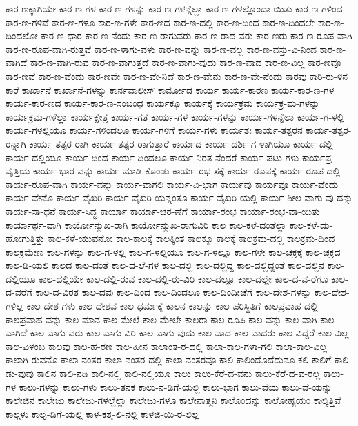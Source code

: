 ಕಾರ-ಣಕ್ಕಾಗಿಯೇ
ಕಾರ-ಣ-ಗಳ
ಕಾರ-ಣ-ಗಳನ್ನು
ಕಾರ-ಣ-ಗಳನ್ನೆಲ್ಲಾ
ಕಾರ-ಣ-ಗಳಲ್ಲೊಂದಾ-ಯಿತು
ಕಾರ-ಣ-ಗಳಿಂದ
ಕಾರ-ಣ-ಗಳಿವೆ
ಕಾರ-ಣ-ಗಳೂ
ಕಾರ-ಣ-ಗಳೇ
ಕಾರ-ಣದ
ಕಾರ-ಣ-ದಲ್ಲಿ
ಕಾರ-ಣ-ದಿಂದ
ಕಾರ-ಣ-ದಿಂದಲೇ
ಕಾರ-ಣ-ದಿಂದಲೋ
ಕಾರ-ಣ-ಧಾರ
ಕಾರ-ಣ-ನೆಂದು
ಕಾರ-ಣ-ರಾಗುವರು
ಕಾರ-ಣ-ರಾದ-ವರು
ಕಾರ-ಣರು
ಕಾರ-ಣ-ರೂಪ-ವಾಗಿ
ಕಾರ-ಣ-ರೂಪ-ವಾಗಿ-ರುತ್ತವೆ
ಕಾರ-ಣ-ಳಾಗು-ವಳು
ಕಾರ-ಣ-ವನ್ನು
ಕಾರ-ಣ-ವಲ್ಲ
ಕಾರ-ಣ-ವಸ್ತು-ವಿ-ನಿಂದ
ಕಾರ-ಣ-ವಾಗಿದೆ
ಕಾರ-ಣ-ವಾಗಿ-ರುವ
ಕಾರ-ಣ-ವಾಗುತ್ತದೆ
ಕಾರ-ಣ-ವಾಗು-ವುದು
ಕಾರ-ಣ-ವಾದ
ಕಾರ-ಣ-ವಿಲ್ಲ
ಕಾರ-ಣವೂ
ಕಾರ-ಣವೆ
ಕಾರ-ಣ-ವೆಂದು
ಕಾರ-ಣವೇ
ಕಾರ-ಣ-ವೇ-ನಿದೆ
ಕಾರ-ಣ-ವೇನು
ಕಾರ-ಣ-ವೇ-ನೆಂದು
ಕಾರವು
ಕಾರಿ-ರು-ಳಿನ
ಕಾರೆ
ಕಾರ್ಖಾನೆ
ಕಾರ್ಖಾನೆ-ಗಳನ್ನು
ಕಾರ್ನವಾಲೀಸ್
ಕಾರ್ಮೋಡ
ಕಾರ್ಯ
ಕಾರ್ಯ-ಕಾರಣ
ಕಾರ್ಯ-ಕಾರ-ಣ-ಗಳ
ಕಾರ್ಯ-ಕಾರ-ಣದ
ಕಾರ್ಯ-ಕಾರ-ಣ-ಸಂಬಂಧ
ಕಾರ್ಯಕ್ಕೂ
ಕಾರ್ಯಕ್ಕೆ
ಕಾರ್ಯಕ್ರಮ
ಕಾರ್ಯಕ್ರ-ಮ-ಗಳನ್ನು
ಕಾರ್ಯಕ್ರಮ-ಗಳೆಲ್ಲಾ
ಕಾರ್ಯಕ್ಷೇತ್ರ
ಕಾರ್ಯ-ಗತ
ಕಾರ್ಯ-ಗಳ
ಕಾರ್ಯ-ಗಳನ್ನು
ಕಾರ್ಯ-ಗಳನ್ನೆಲಾ
ಕಾರ್ಯ-ಗ-ಳಲ್ಲಿ
ಕಾರ್ಯ-ಗಳಲ್ಲಿಯೂ
ಕಾರ್ಯ-ಗಳಿಂದಲೂ
ಕಾರ್ಯ-ಗಳಿಗೆ
ಕಾರ್ಯ-ಗಳು
ಕಾರ್ಯತಃ
ಕಾರ್ಯ-ತತ್ಪರನ
ಕಾರ್ಯ-ತತ್ಪರ-ರನ್ನಾಗಿ
ಕಾರ್ಯ-ತತ್ಪರ-ರಾಗಿ
ಕಾರ್ಯ-ತತ್ಪರ-ರಾಗುತ್ತಾರೆ
ಕಾರ್ಯದ
ಕಾರ್ಯ-ದರ್ಶಿ-ಗ-ಳಾಗಿಯೂ
ಕಾರ್ಯ-ದಲ್ಲಿ
ಕಾರ್ಯ-ದಲ್ಲಿಯೂ
ಕಾರ್ಯ-ದಿಂದ
ಕಾರ್ಯ-ದಿಂದಲೂ
ಕಾರ್ಯ-ನಿರತ-ನೆಂದರೆ
ಕಾರ್ಯ-ಪಟು-ಗಳು
ಕಾರ್ಯಪ್ರ-ವೃತ್ತಿಯ
ಕಾರ್ಯ-ಭಾರ-ವನ್ನು
ಕಾರ್ಯ-ಮಾಡಿ-ಕೊಂಡು
ಕಾರ್ಯ-ರಭ-ಸಕ್ಕೆ
ಕಾರ್ಯ-ರೂಪಕ್ಕೆ
ಕಾರ್ಯ-ರೂಪ-ದಲ್ಲಿ
ಕಾರ್ಯ-ರೂಪ-ವಾಗಿ
ಕಾರ್ಯ-ವನ್ನು
ಕಾರ್ಯ-ವಾಗಲಿ
ಕಾರ್ಯ-ವಿ-ಭಾಗ
ಕಾರ್ಯವು
ಕಾರ್ಯವೂ
ಕಾರ್ಯ-ವೆಂದು
ಕಾರ್ಯ-ವೇನೊ
ಕಾರ್ಯ-ವೈಖರಿ
ಕಾರ್ಯ-ವೈಖರಿ-ಯನ್ನಂತೂ
ಕಾರ್ಯ-ವೈಖರಿ-ಯಲ್ಲಿ
ಕಾರ್ಯ-ಶೀಲ-ವಾಗು-ವು-ದನ್ನು
ಕಾರ್ಯ-ಸಾ-ಧನೆ
ಕಾರ್ಯ-ಸಿದ್ಧ
ಕಾರ್ಯಾ
ಕಾರ್ಯಾ-ಚರ-ಣೆಗೆ
ಕಾರ್ಯಾ-ರಂಭ
ಕಾರ್ಯಾ-ರಂಭ-ವಾ-ಯಿತು
ಕಾರ್ಯಾರ್ಥ-ವಾಗಿ
ಕಾರ್ಯೋನ್ಮುಖ-ರಾಗಿ
ಕಾರ್ಯೋನ್ಮುಖ-ರಾಗುವಿರಿ
ಕಾಲ
ಕಾಲ-ಕಳೆ-ದಂತೆಲ್ಲಾ
ಕಾಲ-ಕಳೆ-ದು-ಹೋಗುತ್ತಿತ್ತು
ಕಾಲ-ಕಳೆ-ಯುವನೋ
ಕಾಲ-ಕಾಲಕ್ಕೆ
ಕಾಲಕ್ಕಿಂತ
ಕಾಲಕ್ಕೂ
ಕಾಲಕ್ಕೆ
ಕಾಲಕ್ರಮ-ದಲ್ಲಿ
ಕಾಲಕ್ರಮ-ದಿಂದ
ಕಾಲಕ್ರಮೇಣ
ಕಾಲ-ಗಳನ್ನು
ಕಾಲ-ಗ-ಳಲ್ಲಿ
ಕಾಲ-ಗ-ಳಲ್ಲಿಯೂ
ಕಾಲ-ಗ-ಳಲ್ಲೂ
ಕಾಲ-ಗಳೇ
ಕಾಲ-ಚಕ್ರಕ್ಕೆ
ಕಾಲ-ಚಕ್ರದ
ಕಾಲ-ಡಿ-ಯಲಿ
ಕಾಲದ
ಕಾಲ-ದಂತೆ
ಕಾಲ-ದ-ಲೆ-ಗಳ
ಕಾಲ-ದಲ್ಲಿ
ಕಾಲ-ದಲ್ಲಿದ್ದ
ಕಾಲ-ದಲ್ಲಿದ್ದಂತೆ
ಕಾಲ-ದಲ್ಲಿನ
ಕಾಲ-ದಲ್ಲಿಯೂ
ಕಾಲ-ದಲ್ಲಿಯೇ
ಕಾಲ-ದಲ್ಲಿ-ರುವ
ಕಾಲ-ದಲ್ಲಿ-ರು-ವಿರಿ
ಕಾಲ-ದಲ್ಲೂ
ಕಾಲ-ದಲ್ಲೇ
ಕಾಲ-ದ-ವ-ರೆಗೂ
ಕಾಲ-ದ-ವರೆಗೆ
ಕಾಲ-ದ-ವಿರತ
ಕಾಲ-ದವು
ಕಾಲ-ದಿಂದ
ಕಾಲ-ದಿಂದಲೂ
ಕಾಲ-ದಿಂದೀಚೆಗೆ
ಕಾಲ-ದೇಶ-ಗಳನ್ನು
ಕಾಲ-ದೇಶ-ಗಳಿಲ್ಲ
ಕಾಲ-ದೇಶ-ಗಳು
ಕಾಲ-ದೇಶವ
ಕಾಲ-ಧರ್ಮಕ್ಕೆ
ಕಾಲನ
ಕಾಲನ್ನು
ಕಾಲ-ಪರಿಸ್ಥಿತಿಗೆ
ಕಾಲಪ್ರವಾಹ-ದಲ್ಲಿ
ಕಾಲಪ್ರವಾಹ-ವನ್ನು
ಕಾಲ-ಮಾನ
ಕಾಲ-ಮೇಲೆ
ಕಾಲ-ಮೇಲೇ
ಕಾಲರಾ
ಕಾಲ-ರೂಪಿ
ಕಾಲ-ವನ್ನು
ಕಾಲ-ವಾಗಿ
ಕಾಲ-ವಾಗಿದೆ
ಕಾಲ-ವಾಗು-ವರು
ಕಾಲ-ವಾಗು-ವಿರಿ
ಕಾಲ-ವಾಗು-ವುದು
ಕಾಲ-ವಾದ
ಕಾಲ-ವಾದರು
ಕಾಲ-ವಿದ್ದರೆ
ಕಾಲ-ವಿಲ್ಲ
ಕಾಲ-ವಿಳಂಬ
ಕಾಲವು
ಕಾಲ-ಹ-ರಣ
ಕಾಲ-ಹೀನ
ಕಾಲಾಂತ-ರ-ದಲ್ಲಿ
ಕಾಲಾ-ಕಾಲ-ಗಳಾ-ಗಲಿ
ಕಾಲಾ-ಕಾಲ-ವಿಲ್ಲ
ಕಾಲಾಗಿ-ರುವನೊ
ಕಾಲಾ-ನಂತರ
ಕಾಲಾ-ನಂತರ-ದಲ್ಲಿ
ಕಾಲಾ-ನಂತರವೂ
ಕಾಲಿ
ಕಾಲಿಂದೊದೆದುನೂ-ಕಲಿ
ಕಾಲಿಗೆ
ಕಾಲಿ-ಡು-ವುವು
ಕಾಲಿನ
ಕಾಲಿ-ನಡಿ
ಕಾಲಿ-ನಲ್ಲಿ
ಕಾಲಿ-ನಲ್ಲಿಯೂ
ಕಾಲು
ಕಾಲು-ಕೆರೆ-ದ-ವನು
ಕಾಲು-ಕೆರೆ-ದ-ವ-ರಲ್ಲ
ಕಾಲು-ಗಳ
ಕಾಲು-ಗಳನ್ನು
ಕಾಲು-ಗಳು
ಕಾಲು-ತನಕ
ಕಾಲು-ನ-ಡಿಗೆ-ಯಲ್ಲಿ
ಕಾಲು-ಭಾಗ
ಕಾಲು-ವೆಯ
ಕಾಲು-ವೆ-ಯನ್ನು
ಕಾಲೇಜಿನ
ಕಾಲೇಜು
ಕಾಲೇಜು-ಗಳಲ್ಲೆಲ್ಲಾ
ಕಾಲೇಜು-ಗಳೂ
ಕಾಲೇನಾತ್ಮನಿ
ಕಾಲೊಂದನ್ನು
ಕಾಲೋಹ್ಯಯಂ
ಕಾಲ್ಕಿತ್ತಿವೆ
ಕಾಲ್ಗಳು
ಕಾಲ್ನ-ಡಿಗೆ-ಯಲ್ಲಿ
ಕಾಳ-ಕತ್ತ-ಲಿ-ನಲ್ಲಿ
ಕಾಳಜಿ-ಯಿ-ರ-ಲಿಲ್ಲ
